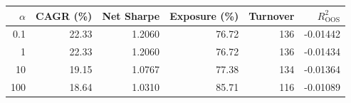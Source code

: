 \begin{tabular}{@{}rrrrrr@{}}
\toprule
$\alpha$ & CAGR (\%) & Net Sharpe & Exposure (\%) & Turnover & $R^2_{\mathrm{OOS}}$ \\
\midrule
0.1 & 22.33 & 1.2060 & 76.72 & 136 & -0.01442 \\
1 & 22.33 & 1.2060 & 76.72 & 136 & -0.01434 \\
10 & 19.15 & 1.0767 & 77.38 & 134 & -0.01364 \\
100 & 18.64 & 1.0310 & 85.71 & 116 & -0.01089 \\
\bottomrule
\end{tabular}
